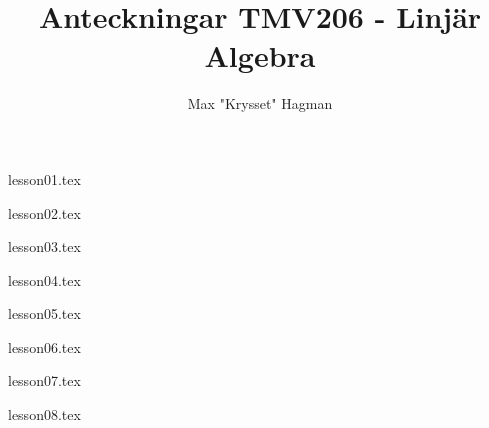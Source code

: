 \documentclass[a4paper]{report}
\title{Anteckningar TMV206 - Linjär Algebra}
\author{Max "Krysset" Hagman}
\begin{document}
    \newcommand{\prim}[1]{#1^{\prime}}

    \maketitle
    \tableofcontents


    {lesson01.tex}

    {lesson02.tex}

    {lesson03.tex}

    {lesson04.tex}

    {lesson05.tex}

    {lesson06.tex}

    {lesson07.tex}

    {lesson08.tex}
\end{document}
